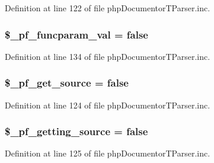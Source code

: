 \-Definition at line 122 of file php\-Documentor\-T\-Parser.\-inc.

\hypertarget{classphp_documentor_t_parser_af08dd609d081b2d3d53004cf11b9bc51}{
\subsubsection[{\$\-\_\-pf\-\_\-funcparam\-\_\-val}]{\setlength{\rightskip}{0pt plus 5cm}\$\-\_\-pf\-\_\-funcparam\-\_\-val = false}}\label{classphp_documentor_t_parser_af08dd609d081b2d3d53004cf11b9bc51}


\-Definition at line 134 of file php\-Documentor\-T\-Parser.\-inc.

\hypertarget{classphp_documentor_t_parser_add5096c29b8d12e57e62d2bb97bd1322}{
\subsubsection[{\$\-\_\-pf\-\_\-get\-\_\-source}]{\setlength{\rightskip}{0pt plus 5cm}\$\-\_\-pf\-\_\-get\-\_\-source = false}}\label{classphp_documentor_t_parser_add5096c29b8d12e57e62d2bb97bd1322}


\-Definition at line 124 of file php\-Documentor\-T\-Parser.\-inc.

\hypertarget{classphp_documentor_t_parser_abec653d627ef89659e91c38819b5ed0c}{
\subsubsection[{\$\-\_\-pf\-\_\-getting\-\_\-source}]{\setlength{\rightskip}{0pt plus 5cm}\$\-\_\-pf\-\_\-getting\-\_\-source = false}}\label{classphp_documentor_t_parser_abec653d627ef89659e91c38819b5ed0c}


\-Definition at line 125 of file php\-Documentor\-T\-Parser.\-inc.

